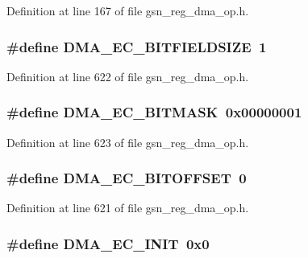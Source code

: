 Definition at line 167 of file gsn\_\-reg\_\-dma\_\-op.h.

\hypertarget{a00547_ada973e36f7e38a6d9edca0e71196aba6}{
\subsubsection[{DMA\_\-EC\_\-BITFIELDSIZE}]{\setlength{\rightskip}{0pt plus 5cm}\#define DMA\_\-EC\_\-BITFIELDSIZE~1}}
\label{a00547_ada973e36f7e38a6d9edca0e71196aba6}


Definition at line 622 of file gsn\_\-reg\_\-dma\_\-op.h.

\hypertarget{a00547_a41f64ebe1a7720a097009d1cac847137}{
\subsubsection[{DMA\_\-EC\_\-BITMASK}]{\setlength{\rightskip}{0pt plus 5cm}\#define DMA\_\-EC\_\-BITMASK~0x00000001}}
\label{a00547_a41f64ebe1a7720a097009d1cac847137}


Definition at line 623 of file gsn\_\-reg\_\-dma\_\-op.h.

\hypertarget{a00547_acc506476718b2cfe23271dbe3e44ce65}{
\subsubsection[{DMA\_\-EC\_\-BITOFFSET}]{\setlength{\rightskip}{0pt plus 5cm}\#define DMA\_\-EC\_\-BITOFFSET~0}}
\label{a00547_acc506476718b2cfe23271dbe3e44ce65}


Definition at line 621 of file gsn\_\-reg\_\-dma\_\-op.h.

\hypertarget{a00547_ada87a117788b6d9d5533d8e95d32a971}{
\subsubsection[{DMA\_\-EC\_\-INIT}]{\setlength{\rightskip}{0pt plus 5cm}\#define DMA\_\-EC\_\-INIT~0x0}}
\label{a00547_ada87a117788b6d9d5533d8e95d32a971}


